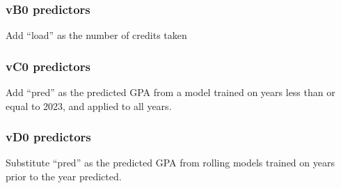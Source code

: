 \documentclass[
]{article}
\begin{document}
\subsubsection{vB0 predictors}\label{vb0-predictors}

Add ``load'' as the number of credits taken

\subsubsection{vC0 predictors}\label{vc0-predictors}

Add ``pred'' as the predicted GPA from a model trained on years less
than or equal to 2023, and applied to all years.

\subsubsection{vD0 predictors}\label{vd0-predictors}

Substitute ``pred'' as the predicted GPA from rolling models trained on
years prior to the year predicted.
\end{document}

